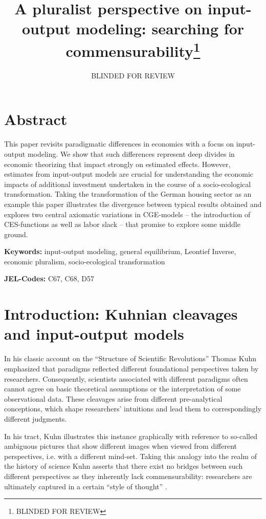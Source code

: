 \documentclass{article}
\title{A pluralist perspective on input-output modeling:\break 
searching for commensurability\thanks{BLINDED FOR REVIEW}}
\author[1]{BLINDED FOR REVIEW}
\begin{document}
\maketitle

\section*{Abstract}

This paper revisits paradigmatic differences in economics with a focus on input-output modeling. We show that such differences represent deep divides in economic theorizing that impact strongly on estimated effects. However, estimates from input-output models are crucial for understanding the economic impacts of additional investment undertaken in the course of a socio-ecological transformation. Taking the transformation of the German housing sector as an example this paper illustrates the divergence between typical results obtained and explores two central axiomatic variations in CGE-models -- the introduction of CES-functions as well as labor slack -- that promise to explore some middle ground.

\textbf{Keywords:} input-output modeling, general equilibrium, Leontief Inverse, economic pluralism, socio-ecological transformation

\textbf{JEL-Codes:} C67, C68, D57 

\newpage

\section{Introduction: Kuhnian cleavages and input-output models}

In his classic account on the “Structure of Scientific Revolutions” Thomas Kuhn \citetext{\citealp{Kuhn1962}, see also \citealt{Fleck1935}} emphasized that paradigms reflected different foundational perspectives taken by researchers. Consequently, scientists associated with different paradigms often cannot agree on basic theoretical assumptions or the interpretation of some observational data. These cleavages arise from different pre-analytical conceptions, which shape researchers’ intuitions and lead them to correspondingly different judgments.

In his tract, Kuhn illustrates this instance graphically with reference to so-called ambiguous pictures that show different images when viewed from different perspectives, i.e. with a different mind-set. Taking this analogy into the realm of the history of science Kuhn asserts that there exist no bridges between such different perspectives as they inherently lack commensurability: researchers are ultimately captured in a certain “style of thought” \citep{Fleck1935}.
\end{document}
